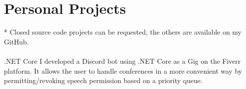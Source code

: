 \section*{Personal Projects}
{\color{violet}*}
\footnotesize
Closed source code projects can be requested, the others are available on my GitHub.\\\\
\normalsize
{}
  {.NET Core}
  {I developed a Discord bot using .NET Core as a Gig on the Fiverr platform.
   It allows the user to handle conferences in a more convenient way by permitting/revoking speech permission based on a priority queue.}
